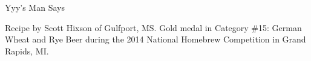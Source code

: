 \begin{recipe}{Yyy's Man Says}

\begin{aboutblock}
Recipe by Scott Hixson of Gulfport, MS. Gold medal in Category \#15: German Wheat
and Rye Beer during the 2014 National Homebrew Competition in Grand Rapids, MI.
\sourceaha
\end{aboutblock}


\begin{methodandtiming}

\begin{mashsteps}
\end{mashsteps}

\begin{fermentationsteps}
\end{fermentationsteps}

\end{methodandtiming}

\recipebreak

\begin{ingredientsblock}

\begin{malts}
\end{malts}

\begin{hops}
\end{hops}


\end{ingredientsblock}

\end{recipe}
